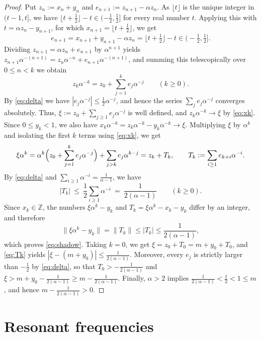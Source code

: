 \documentclass[11pt,reqno]{amsart}
\theoremstyle{definition}
\theoremstyle{remark}
\numberwithin{equation}{section}
\newcommand{\Z}{\mathbb{Z}}
\begin{document}
\begin{proof}
Put $z_n:=x_n+y_n$ and $e_{n+1}:=z_{n+1}-\alpha z_n$. As $\lfloor t\rfloor$ is the unique integer in $(t-1,t]$, we have $\lfloor t+\tfrac12\rfloor-t\in(-\tfrac12,\tfrac12]$ for every real number $t$. Applying this with $t=\alpha z_n-y_{n+1}$, for which $x_{n+1}=\lfloor t+\tfrac12\rfloor$, we get
\begin{equation}\label{eq:delta}
e_{n+1}=x_{n+1}+y_{n+1}-\alpha z_n=\lfloor t+\tfrac12\rfloor-t\in\bigl(-\tfrac12,\tfrac12\bigr] .
\end{equation}
Dividing $z_{n+1}=\alpha z_n+e_{n+1}$ by $\alpha^{n+1}$ yields $z_{n+1}\alpha^{-(n+1)}=z_n\alpha^{-n}+e_{n+1}\alpha^{-(n+1)}$, and summing this telescopically over $0\le n<k$ we obtain
\begin{equation}\label{eq:xk}
z_k\alpha^{-k}=z_0+\sum_{j=1}^k e_j\alpha^{-j}\qquad(k\ge0).
\end{equation}
By \eqref{eq:delta} we have $|e_j\alpha^{-j}|\le\tfrac12\alpha^{-j}$, and hence the series $\sum_je_j\alpha^{-j}$ converges absolutely. Thus, $\xi:=z_0+\sum_{j\ge1}e_j\alpha^{-j}$ is well defined, and $z_k\alpha^{-k}\to\xi$ by \eqref{eq:xk}. Since $0\le y_k<1$, we also have $x_k\alpha^{-k}=z_k\alpha^{-k}-y_k\alpha^{-k}\to\xi$. Multiplying $\xi$ by $\alpha^k$ and isolating the first $k$ terms using \eqref{eq:xk}, we get
\[
\xi\alpha^k=\alpha^k\Bigl(z_0+\sum_{j=1}^ke_j\alpha^{-j}\Bigr)+\sum_{j>k}e_j\alpha^{k-j}=z_k+T_k,\qquad T_k:=\sum_{i\ge1}e_{k+i}\alpha^{-i}.
\]
By \eqref{eq:delta} and $\sum_{i\ge1}\alpha^{-i}=\tfrac1{\alpha-1}$, we have
\begin{equation}\label{eq:Tk}
|T_k|\ \le\ \frac12\sum_{i\ge1}\alpha^{-i}\ =\ \frac1{2(\alpha-1)}\qquad(k\ge0).
\end{equation}
Since $x_k\in\Z$, the numbers $\xi\alpha^k-y_k$ and $T_k=\xi\alpha^k-x_k-y_k$ differ by an integer, and therefore
\[
\|\xi\alpha^k-y_k\|=\|T_k\|\le|T_k|\le\frac1{2(\alpha-1)},
\]
which proves \eqref{eq:shadow}. Taking $k=0$, we get $\xi=z_0+T_0=m+y_0+T_0$, and \eqref{eq:Tk} yields $|\xi-(m+y_0)|\le\tfrac1{2(\alpha-1)}$. Moreover, every $e_j$ is strictly larger than $-\tfrac12$ by \eqref{eq:delta}, so that $T_0>-\tfrac1{2(\alpha-1)}$ and $\xi>m+y_0-\tfrac1{2(\alpha-1)}\ge m-\tfrac1{2(\alpha-1)}$. Finally, $\alpha>2$ implies $\tfrac1{2(\alpha-1)}<\tfrac12<1\le m$, and hence $m-\tfrac1{2(\alpha-1)}>0$.
\end{proof}

\section{Resonant frequencies}\label{sec:tree}
\end{document}

